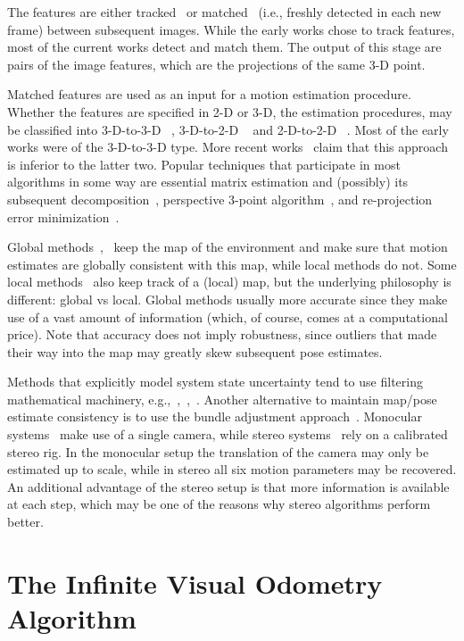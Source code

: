 \documentclass{report}
\begin{document}
The features are either tracked~\cite{Hedborg2009} or
matched~\cite{Geiger2011} (i.e., freshly detected in each new frame)
between subsequent images. While the early works chose to track
features, most of the current works detect and match them. The output
of this stage are pairs of the image features, which are the
projections of the same 3-D point.

Matched features are used as an input for a motion estimation
procedure.  Whether the features are specified in 2-D or 3-D, the
estimation procedures, may be classified into 3-D-to-3-D
~\cite{Milella2006}, 3-D-to-2-D ~\cite{Geiger2011} and 2-D-to-2-D
~\cite{Nister2004}. Most of the early works were of the 3-D-to-3-D
type.  More recent works~\cite{Nister2004} claim that this approach is
inferior to the latter two. Popular techniques that participate in
most algorithms in some way are essential matrix estimation and
(possibly) its subsequent decomposition~\cite{Nister2004}, perspective
3-point algorithm~\cite{Kneip1991}, and re-projection error
minimization~\cite{Geiger2011}.

Global methods~\cite{Klein2007},~\cite{Newcombe2011} keep the map of
the environment and make sure that motion estimates are globally
consistent with this map, while local methods do not.  Some local
methods~\cite{Badino2013} also keep track of a (local) map, but the
underlying philosophy is different: global vs local.  Global methods
usually more accurate since they make use of a vast amount of
information (which, of course, comes at a computational price).  Note
that accuracy does not imply robustness, since outliers that made
their way into the map may greatly skew subsequent pose estimates.

Methods that explicitly model system state uncertainty tend to use
filtering mathematical machinery,
e.g.,~\cite{Konolige2010},~\cite{Olson2003},~\cite{Kaess2008}.
Another alternative to maintain map/pose estimate consistency is to
use the bundle adjustment approach~\cite{Triggs2000}. Monocular
systems~\cite{Song} make use of a single camera, while stereo
systems~\cite{Geiger2011} rely on a calibrated stereo rig. In the
monocular setup the translation of the camera may only be estimated up
to scale, while in stereo all six motion parameters may be
recovered. An additional advantage of the stereo setup is that more
information is available at each step, which may be one of the reasons
why stereo algorithms perform better.

\chapter{The Infinite Visual Odometry Algorithm}
\end{document}
